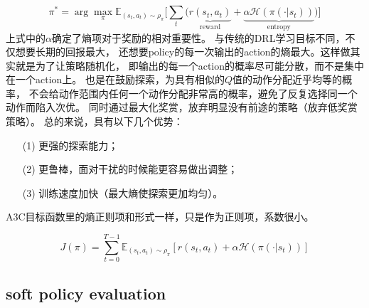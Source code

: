 \begin{equation}\label{maximum_entropy_objective}
\pi^* = \arg\max_\pi \mathbb{E}_{(s_t,a_t)\sim\rho_\pi}
\Big[ \sum_t \big(
\underbrace{r(s_t, a_t)}_{\text{reward}} + 
\underbrace{\alpha \mathcal{H}(\pi(\cdot | s_t))}_{\text{entropy}}
\big)\Big]
\end{equation}
上式中的$\alpha$确定了熵项对于奖励的相对重要性。
与传统的DRL学习目标不同，不仅想要长期的回报最大，
还想要policy的每一次输出的action的熵最大。这样做其实就是为了让策略随机化，
即输出的每一个action的概率尽可能分散，而不是集中在一个action上。
也是在鼓励探索，为具有相似的$Q$值的动作分配近乎均等的概率，
不会给动作范围内任何一个动作分配非常高的概率，避免了反复选择同一个动作而陷入次优。
同时通过最大化奖赏，放弃明显没有前途的策略（放弃低奖赏策略）。
总的来说，具有以下几个优势：
\begin{itemize}
\setlength{\parskip}{0pt}
\item[(1)]
更强的探索能力；
\item[(2)]
更鲁棒，面对干扰的时候能更容易做出调整；
\item[(3)]
训练速度加快（最大熵使探索更加均匀）。
\end{itemize}

A3C目标函数里的熵正则项和形式一样，只是作为正则项，系数很小。

\begin{equation}\label{entropy_of_policy}
J(\pi) = \sum_{t=0}^{T-1} \mathbb{E}_{(s_t,a_t)\sim\rho_\pi}
[r(s_t, a_t) + \alpha \mathcal{H}(\pi(\cdot | s_t))]
\end{equation}


\subsection{soft policy evaluation}

\cite{YZhang2020}
\parencite{YZhang2020}


